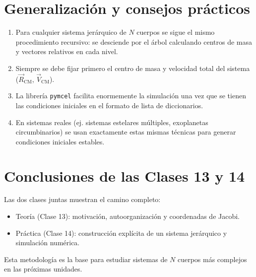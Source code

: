 \section{Generalización y consejos prácticos}
\begin{enumerate}
    \item Para cualquier sistema jerárquico de \(N\) cuerpos se sigue el mismo procedimiento recursivo: se desciende por el árbol calculando centros de masa y vectores relativos en cada nivel.
    \item Siempre se debe fijar primero el centro de masa y velocidad total del sistema (\(\vec{R}_{\text{CM}}\), \(\vec{V}_{\text{CM}}\)).
    \item La librería \texttt{pymcel} facilita enormemente la simulación una vez que se tienen las condiciones iniciales en el formato de lista de diccionarios.
    \item En sistemas reales (ej. sistemas estelares múltiples, exoplanetas circumbinarios) se usan exactamente estas mismas técnicas para generar condiciones iniciales estables.
\end{enumerate}

\section{Conclusiones de las Clases 13 y 14}
Las dos clases juntas muestran el camino completo:
\begin{itemize}
    \item Teoría (Clase 13): motivación, autoorganización y coordenadas de Jacobi.
    \item Práctica (Clase 14): construcción explícita de un sistema jerárquico y simulación numérica.
\end{itemize}

Esta metodología es la base para estudiar sistemas de \(N\) cuerpos más complejos en las próximas unidades.




